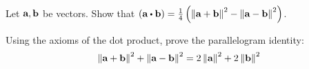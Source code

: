 \begin{enumialphparenastyle}
\begin{ex} Let $\mbox{\bf a},\mbox{\bf b}$ be vectors. Show that $\tup{\vect{a}\dotprod \vect{b}} =\frac{1}{4}\tup{\norm{
\vect{a}+\vect{b}} ^{2}-\norm{\vect{a}-\vect{b}} ^{2}}$.
\end{ex}

\begin{ex} Using the axioms of the dot product, prove the parallelogram identity: 
\begin{equation*}
\left\|\mbox{\bf a}+\mbox{\bf b}\right\| ^{2}+\left\|\mbox{\bf a}-\mbox{\bf b}\right\|
^{2}=2\left\|\mbox{\bf a}\right\| ^{2}+2\left\|\mbox{\bf b}
\right\| ^{2}
\end{equation*}
\end{ex}

\end{enumialphparenastyle}

